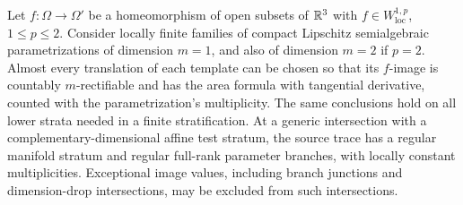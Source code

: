 \begin{lemma}
\label{lt:trace-slicing}
Let $f:\Omega\to\Omega'$ be a homeomorphism of open subsets of
$\mathbb R^3$ with $f\in W^{1,p}_{\mathrm{loc}}$, $1\leq p\leq2$.
Consider locally finite families of compact Lipschitz semialgebraic
parametrizations of dimension $m=1$, and also of dimension $m=2$ if
$p=2$.  Almost every translation of each template can be chosen so
that its $f$-image is countably $m$-rectifiable and has the area formula
with tangential derivative, counted with the parametrization's
multiplicity.  The same conclusions hold on all lower strata needed
in a finite stratification.  At a generic intersection with a
complementary-dimensional affine test stratum, the source trace has a
regular manifold stratum and regular full-rank parameter branches,
with locally constant multiplicities.  Exceptional image values,
including branch junctions and dimension-drop intersections, may be
excluded from such intersections.
\end{lemma}

